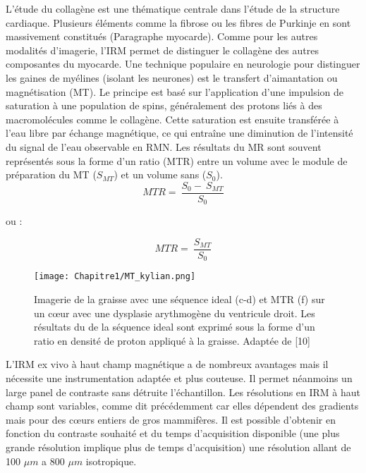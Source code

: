 L’étude du collagène est une thématique centrale dans l’étude de la structure cardiaque. Plusieurs éléments comme la fibrose ou les fibres de Purkinje en sont massivement constitués (Paragraphe myocarde). Comme pour les autres modalités d’imagerie, l’IRM permet de distinguer le collagène des autres composantes du myocarde. Une technique populaire en neurologie pour distinguer les gaines de myélines (isolant les neurones) est le transfert d’aimantation ou magnétisation (MT). Le principe est basé sur l'application d'une impulsion de saturation à une population de spins, généralement des protons liés à des macromolécules comme le collagène. Cette saturation est ensuite transférée à l'eau libre par échange magnétique, ce qui entraîne une diminution de l'intensité du signal de l'eau observable en RMN. Les résultats du MR sont souvent représentés sous la forme d’un ratio (MTR) entre un volume avec le module de préparation du MT  ($S_{MT}$) et un volume sans ($S_0$).
\begin{equation}
\nonumber
MTR=\ \frac{S_0-\ S_{MT}}{S_0}
\end{equation}

ou \cite{Haliot2021} :

\begin{equation}
\nonumber
MTR=\ \frac{S_{MT}}{S_0}
\end{equation}


\begin{figure}[!htbp]
  \begin{center}
    \texttt{[image: Chapitre1/MT\_kylian.png]}
     \end{center}
    \caption{Imagerie de la graisse avec une séquence ideal (c-d) et MTR (f) sur un cœur avec une dysplasie arythmogène du ventricule droit. Les résultats du de la séquence ideal sont exprimé sous la forme d’un ratio en densité de proton appliqué à la graisse. Adaptée de [10]}
  \label{fig:IRM_exvivo_MT}
\end{figure}

L’IRM ex vivo à haut champ magnétique a de nombreux avantages mais il nécessite une instrumentation adaptée et plus couteuse. Il permet néanmoins un large panel de contraste sans détruite l’échantillon. Les résolutions en IRM à haut champ sont variables, comme dit précédemment car elles dépendent des gradients mais pour des cœurs entiers de gros mammifères. Il est possible d’obtenir en fonction du contraste souhaité et du temps d’acquisition disponible (une plus grande résolution implique plus de temps d’acquisition) une résolution allant de 100 $\mu m$ a 800 $\mu m$ isotropique.

